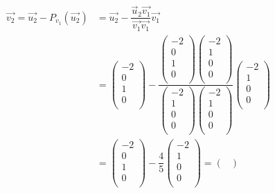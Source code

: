 \documentclass[12pt,a4paper]{report}
\begin{document}
\begin{enumerate}
\begin{enumerate}
\begin{align*}
\vec{v_{2}}=\vec{u_{2}}-P_{v_{1}}(\vec{u_{2}})&=\vec{u_{2}}-\dfrac{\vec{u}_{2}\vec{v_{1}}}{\vec{v_{1}}\vec{v_{1}}}\vec{v_{1}}\\
&=\begin{pmatrix}
-2\\
0\\
1\\
0\\
\end{pmatrix}-\dfrac{\begin{pmatrix}
-2\\
0\\
1\\
0\\
\end{pmatrix}\begin{pmatrix}
-2\\
1\\
0\\
0\\
\end{pmatrix}}{\begin{pmatrix}
-2\\
1\\
0\\
0\\
\end{pmatrix}\begin{pmatrix}
-2\\
1\\
0\\
0\\
\end{pmatrix}}\begin{pmatrix}
-2\\
1\\
0\\
0\\
\end{pmatrix}\\
&=\begin{pmatrix}
-2\\
0\\
1\\
0\\
\end{pmatrix}-\dfrac{4}{5}\begin{pmatrix}
-2\\
1\\
0\\
0\\
\end{pmatrix}
=\begin{pmatrix}

\end{pmatrix}
\end{align*}
\end{enumerate}
\end{enumerate}
\end{document}
